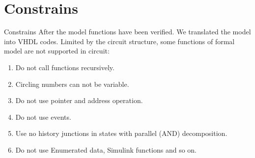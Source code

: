 \documentclass[12pt,beamer]{beamer}
\begin{document}
%
%
%
%
%

%	
%
%

\section{Constrains}
\begin{frame}{Constrains}
	After the model functions have been verified. We translated the model into VHDL codes. Limited by the circuit structure,
	some functions of formal model are not supported in circuit:
	\vspace{10pt}
	\begin{enumerate}
		\item Do not call functions recursively.
		\item Circling numbers can not be variable.
		\item Do not use pointer and address operation.
		\item Do not use events.
		\item Use no history junctions in states with parallel (AND) decomposition.
		\item Do not use Enumerated data, Simulink functions and so on.
	\end{enumerate}
\end{frame}
\end{document}
